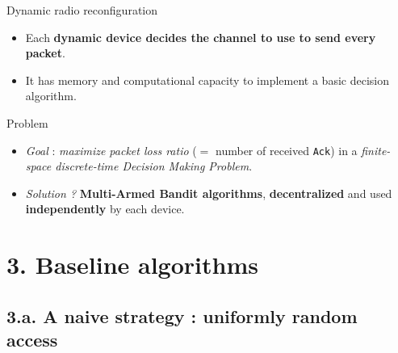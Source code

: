 \begin{frameO}[Hypotheses ($2/2$)]

    \begin{colorblock}{Dynamic radio reconfiguration}

        \begin{itemize}\tightlist
            \item
                  Each \textbf{dynamic device decides the channel to use to send every
                      packet}.
            \item
                  It has memory and computational capacity to implement a basic decision
                  algorithm.
        \end{itemize}

    \end{colorblock}

    \vspace*{20pt}

    \begin{lightblock}{Problem}

        \begin{itemize}\tightlist
            \item
                  \emph{Goal} : \emph{maximize packet loss ratio} (\(=\) number of
                  received \texttt{Ack}) in a \emph{finite-space discrete-time Decision
                      Making Problem}.
            \item
                  \emph{Solution ?} \textbf{Multi-Armed Bandit algorithms},
                  \textbf{decentralized} and used \textbf{independently} by each device.
        \end{itemize}

    \end{lightblock}

\end{frameO}



\section{\hfill{}3. Baseline algorithms\hfill{}}

\subsection{\hfill{}3.a. A naive strategy : uniformly random access\hfill{}}

